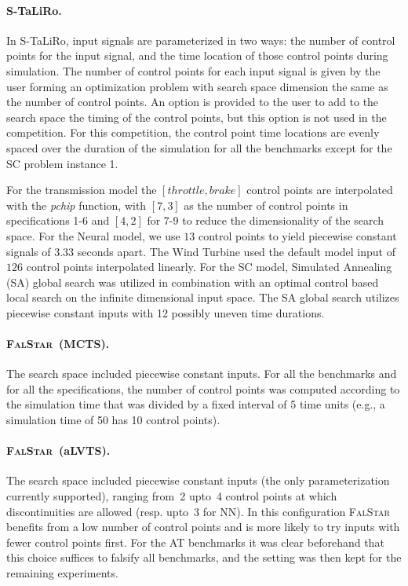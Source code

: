 \documentclass[a4paper]{easychair}
\newcommand{\STaLiRo}{S-TaLiRo\xspace}
\newcommand{\FalStar}{\textsc{FalStar}\xspace}
\begin{document}
    \paragraph{\STaLiRo.} In S-TaLiRo, input signals are parameterized in two ways:
    the number of control points for the input signal, and the
    time location of those control points during simulation. The number of
    control points for each input signal is given by the user forming
    an optimization problem with search space dimension the same as the number of 
    control points. An option is provided to the user to add to the search space 
    the timing of the control points, but this option is not used in the competition.
    For this competition, the control point time locations are evenly spaced over the duration 
    of the simulation for all the benchmarks except for the SC problem instance 1.

    For the transmission model the $[throttle, brake]$ control points
    are interpolated with the \textit{pchip} function, with $[7, 3]$ as
    the number of control points in specifications 1-6 and $[4,2]$ for
    7-9 to reduce the dimensionality of the search space. For the Neural model, we use $13$
    control points to yield piecewise constant signals of $3.33$ seconds apart.
    The Wind Turbine used the default model input of $126$ control points interpolated linearly.
    For the SC model, Simulated Annealing (SA) global search was utilized in combination with an optimal control based local search on the infinite dimensional input space. The SA global search utilizes piecewise constant inputs with 12 possibly uneven time durations.

    \paragraph{\FalStar~(MCTS).}
    The search space included piecewise constant inputs. For all the benchmarks and for all the specifications, the number of control points was computed according to the simulation time that was divided by a fixed interval of 5 time units (e.g., a simulation time of 50 has 10 control points).

    \paragraph{\FalStar~(aLVTS).} The search space included piecewise constant
    inputs (the only parameterization currently supported), ranging
    from~2 upto~4 control points at which discontinuities are allowed
    (resp. upto~3 for NN).  In this configuration \FalStar benefits
    from a low number of control points and is more likely to try
    inputs with fewer control points first.  For the AT benchmarks it
    was clear beforehand that this choice suffices to falsify all
    benchmarks, and the setting was then kept for the remaining
    experiments.
\end{document}
